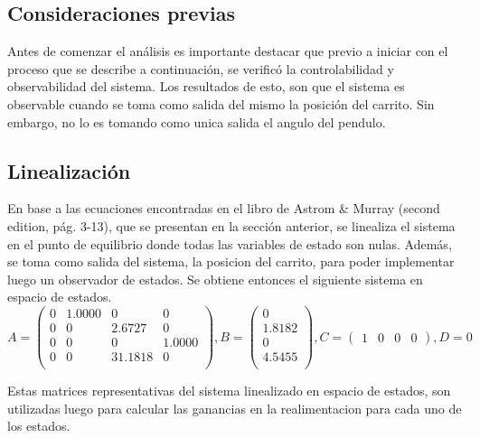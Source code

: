%
%
%

\subsection{Consideraciones previas}
Antes de comenzar el an\'alisis es importante destacar que previo a iniciar con el proceso que se describe a continuaci\'on, se verific\'o la controlabilidad y observabilidad del sistema. Los resultados de esto, son que el sistema es observable cuando se toma como salida del mismo la posici\'on del carrito. Sin embargo, no lo es tomando como unica salida el angulo del pendulo.
\subsection{Linealizaci\'on}
En base a las ecuaciones encontradas en el libro de  Astrom \& Murray (second edition, pág. 3-13), que se presentan en la secci\'on anterior, se linealiza el sistema en el punto de equilibrio donde todas las variables de estado son nulas. Adem\'as, se toma como salida del sistema, la posicion del carrito, para poder implementar luego un observador de estados.
Se obtiene entonces el siguiente sistema en espacio de estados.
\begin{equation}
A=
	\begin{pmatrix}
		0   & 1.0000  &       0   &      0\\
         0  &       0  &  2.6727   &      0\\
         0     &   0      &   0  &  1.0000\\
         0    &     0  & 31.1818      &   0\\
	\end{pmatrix},
B=
	\begin{pmatrix}
		 0\\
    1.8182\\
         0\\
    4.5455\\

	\end{pmatrix},
C=
\begin{pmatrix}
		1&0&0&0

	\end{pmatrix},
D=0
\end{equation}

Estas matrices representativas del sistema linealizado en espacio de estados, son utilizadas luego para calcular las ganancias en la realimentacion para cada uno de los estados.

